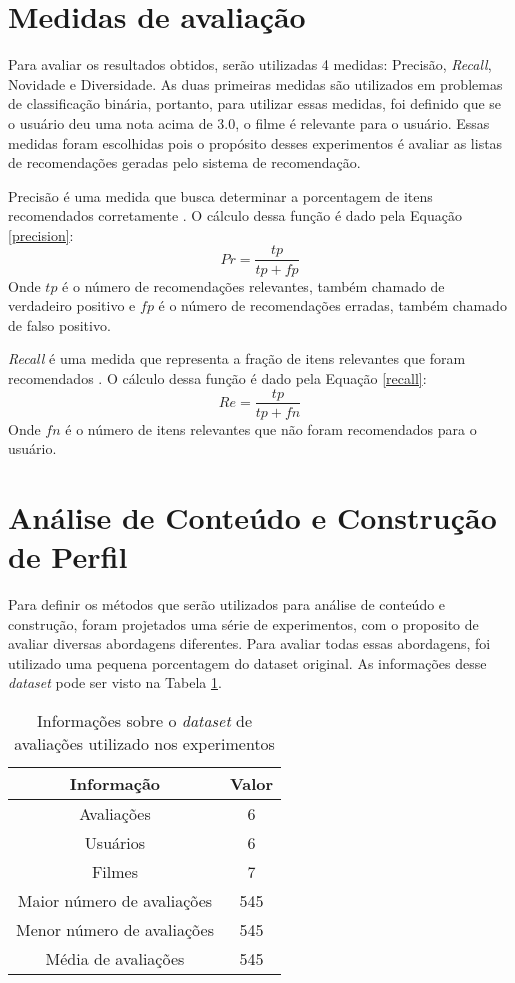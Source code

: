\section{Medidas de avaliação}
Para avaliar os resultados obtidos, serão utilizadas 4 medidas: Precisão, \textit{Recall}, Novidade e Diversidade. As duas primeiras medidas são utilizados em problemas de classificação binária, portanto, para utilizar essas medidas, foi definido que se o usuário deu uma nota acima de 3.0, o filme é relevante para o usuário.
Essas medidas foram escolhidas pois o propósito desses experimentos é avaliar as listas de recomendações geradas pelo sistema de recomendação. 

Precisão é uma medida que busca determinar a porcentagem de itens recomendados corretamente \cite{olson2008advanced}. O cálculo dessa função é dado pela Equação \ref{precision}:
\begin{equation}
\label{precision}
    Pr = \frac{tp}{tp + fp} 
\end{equation}
Onde \(tp\) é o número de recomendações relevantes, também chamado de verdadeiro positivo e \(fp\) é o número de recomendações erradas, também chamado de falso positivo.

\textit{Recall} é uma medida que representa a fração de itens relevantes que foram recomendados \cite{olson2008advanced}. O cálculo dessa função é dado pela Equação \ref{recall}:
\begin{equation}
\label{recall}
    Re = \frac{tp}{tp + fn} 
\end{equation}
Onde \(fn\) é o número de itens relevantes que não foram recomendados para o usuário.
\section{Análise de Conteúdo e Construção de Perfil}
Para definir os métodos que serão utilizados para análise de conteúdo e construção, foram projetados uma série de experimentos, com o proposito de avaliar diversas abordagens diferentes. Para avaliar todas essas abordagens, foi utilizado uma pequena porcentagem do dataset original. As informações desse \textit{dataset} pode ser visto na Tabela \ref{tab:exp_ac_cp}. 

\begin{table}[h]
\label{tab:exp_ac_cp}
 \centering
\begin{tabular}{|c| c |}
\hline
Informação &  Valor \\ 
\hline
Avaliações & 6  \\ 
\hline
Usuários & 6 \\ 
\hline
Filmes & 7 \\
\hline
Maior número de avaliações & 545  \\
\hline
Menor número de avaliações & 545 \\
\hline
Média de avaliações & 545  \\
\hline    
\end{tabular}
\caption{\label{tab:exp_ac_cp}Informações sobre o \textit{dataset} de avaliações utilizado nos experimentos}
\end{table}
